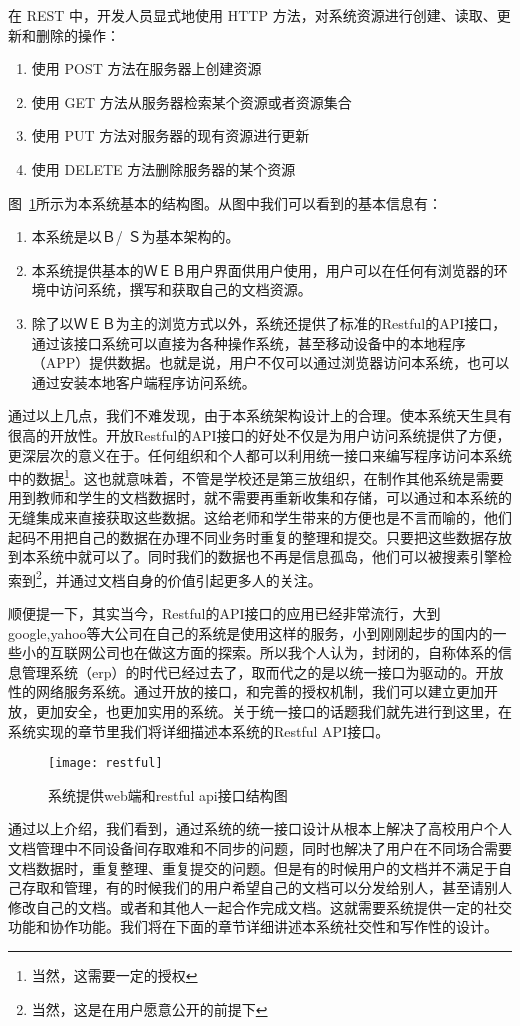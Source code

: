 在 REST 中，开发人员显式地使用 HTTP 方法，对系统资源进行创建、读取、更新和删除的操作：
\begin{enumerate}
\item 使用 POST 方法在服务器上创建资源
\item 使用 GET 方法从服务器检索某个资源或者资源集合
\item 使用 PUT 方法对服务器的现有资源进行更新
\item 使用 DELETE 方法删除服务器的某个资源
\end{enumerate}

图~\ref{fig:xfig9}所示为本系统基本的结构图。从图中我们可以看到的基本信息有：
\begin{enumerate}
\item 本系统是以Ｂ/ Ｓ为基本架构的。
\item 本系统提供基本的ＷＥＢ用户界面供用户使用，用户可以在任何有浏览器的环境中访问系统，撰写和获取自己的文档资源。
\item 除了以ＷＥＢ为主的浏览方式以外，系统还提供了标准的Restful的API接口，通过该接口系统可以直接为各种操作系统，甚至移动设备中的本地程序（APP）提供数据。也就是说，用户不仅可以通过浏览器访问本系统，也可以通过安装本地客户端程序访问系统。
\end{enumerate}
通过以上几点，我们不难发现，由于本系统架构设计上的合理。使本系统天生具有很高的开放性。开放Restful的API接口的好处不仅是为用户访问系统提供了方便，更深层次的意义在于。任何组织和个人都可以利用统一接口来编写程序访问本系统中的数据\footnote{当然，这需要一定的授权}。这也就意味着，不管是学校还是第三放组织，在制作其他系统是需要用到教师和学生的文档数据时，就不需要再重新收集和存储，可以通过和本系统的无缝集成来直接获取这些数据。这给老师和学生带来的方便也是不言而喻的，他们起码不用把自己的数据在办理不同业务时重复的整理和提交。只要把这些数据存放到本系统中就可以了。同时我们的数据也不再是信息孤岛，他们可以被搜素引擎检索到\footnote{当然，这是在用户愿意公开的前提下}，并通过文档自身的价值引起更多人的关注。

顺便提一下，其实当今，Restful的API接口的应用已经非常流行，大到 google,yahoo等大公司在自己的系统是使用这样的服务，小到刚刚起步的国内的一些小的互联网公司也在做这方面的探索。所以我个人认为，封闭的，自称体系的信息管理系统（erp）的时代已经过去了，取而代之的是以统一接口为驱动的。开放性的网络服务系统。通过开放的接口，和完善的授权机制，我们可以建立更加开放，更加安全，也更加实用的系统。关于统一接口的话题我们就先进行到这里，在系统实现的章节里我们将详细描述本系统的Restful API接口。
\begin{figure}[H]
  \centering
  \texttt{[image: restful]}
  \caption{系统提供web端和restful api接口结构图}
  \label{fig:xfig9}
\end{figure}
通过以上介绍，我们看到，通过系统的统一接口设计从根本上解决了高校用户个人文档管理中不同设备间存取难和不同步的问题，同时也解决了用户在不同场合需要文档数据时，重复整理、重复提交的问题。但是有的时候用户的文档并不满足于自己存取和管理，有的时候我们的用户希望自己的文档可以分发给别人，甚至请别人修改自己的文档。或者和其他人一起合作完成文档。这就需要系统提供一定的社交功能和协作功能。我们将在下面的章节详细讲述本系统社交性和写作性的设计。

